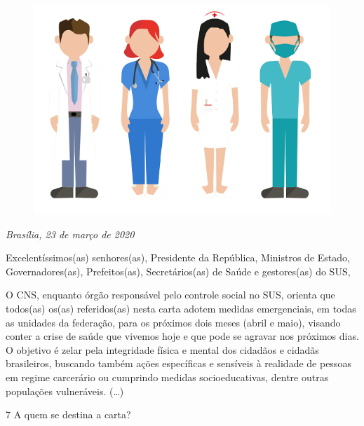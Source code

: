 \begin{myquote}

\begin{figure}[H]
\centering
\includegraphics[scale=0.4]{./imgSAEB_7_POR/media/image30.png}
\end{figure}

\emph{Brasília, 23 de março de 2020}

Excelentíssimos(as) senhores(as), Presidente da República, Ministros de
Estado, Governadores(as), Prefeitos(as), Secretários(as) de Saúde e
gestores(as) do SUS,

O CNS, enquanto órgão responsável pelo controle social no SUS, orienta
que todos(as) os(as) referidos(as) nesta carta adotem medidas
emergenciais, em todas as unidades da federação, para os próximos dois
meses (abril e maio), visando conter a crise de saúde que vivemos hoje e
que pode se agravar nos próximos dias. O objetivo é zelar pela
integridade física e mental dos cidadãos e cidadãs brasileiros, buscando
também ações específicas e sensíveis à realidade de pessoas em regime
carcerário ou cumprindo medidas socioeducativas, dentre outras
populações vulneráveis. (\ldots{})


\end{myquote} 

\num{7} A quem se destina a carta?

